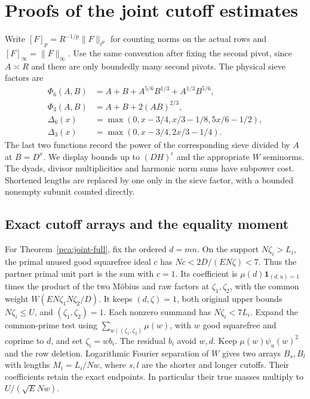 \section{Proofs of the joint cutoff estimates}
\label{pca:joint-details}

Write \([F]_p=R^{-1/p}\|F\|_{\ell^p}\) for counting norms on the
actual rows and \([F]_\infty=\|F\|_\infty\). Use the same convention
after fixing the second pivot, since \(A\asymp R\) and there are
only boundedly many second pivots. The physical sieve factors are
\[
 \begin{aligned}
 \Phi_6(A,B)&=A+B+A^{5/6}B^{1/3}+A^{1/3}B^{5/6},\\
 \Phi_3(A,B)&=A+B+2(AB)^{2/3},\\
 \Delta_6(x)&=\max(0,x-3/4,x/3-1/8,5x/6-1/2),\\
 \Delta_3(x)&=\max(0,x-3/4,2x/3-1/4).
 \end{aligned}
\]
The last two functions record the power of the corresponding
sieve divided by \(A\) at \(B=D^x\). We display bounds up to
\((DH)^\epsilon\) and the appropriate \(W\) seminorms.
The dyads, divisor multiplicities and harmonic norm sums have
subpower cost. Shortened lengths are replaced by one only in
the sieve factor, with a bounded nonempty subunit counted directly.

\subsection{Exact cutoff arrays and the equality moment}
\label{pca:joint-arrays}

For Theorem~\ref{pca:joint-full}, fix the ordered \(d=mn\).
On the support \(N\zeta_i>L_i\), the primal unused good
squarefree ideal \(c\) has \(Nc<2D/(EN\zeta)<7\). Thus the
partner primal unit part is the sum with \(c=1\). Its coefficient
is \(\mu(d)\mathbf1_{(d,u)=1}\) times the product of the two
Möbius and raw factors at \(\zeta_1,\zeta_2\), with the common
weight \(W(EN\zeta_1N\zeta_2/D)\).
It keeps \((d,\zeta)=1\), both original upper bounds \(N\zeta_i\le U\),
and \((\zeta_1,\zeta_2)=1\). Each nonzero summand has
\(N\zeta_i<7L_i\). Expand the common-prime test using
\(\sum_{w\mid(\zeta_1,\zeta_2)}\mu(w)\), with \(w\) good
squarefree and coprime to \(d\), and set \(\zeta_i=w b_i\).
The residual \(b_i\) avoid \(w,d\). Keep \(\mu(w)\psi_u(w)^2\)
and the row deletion. Logarithmic Fourier separation of \(W\)
gives two arrays \(B_s,B_l\) with lengths \(M_i=L_i/Nw\),
where \(s,l\) are the shorter and longer cutoffs. Their
coefficients retain the exact endpoints. In particular their
true masses multiply to \(U/(\sqrt E Nw)\).

